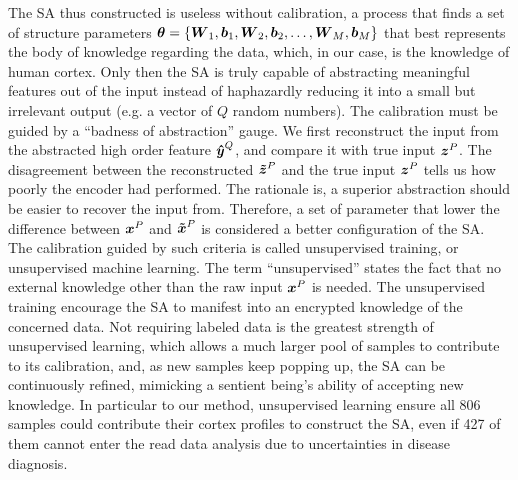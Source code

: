 The SA thus constructed is useless without calibration, a process that finds a set of structure parameters $\boldsymbol{\theta}=\{\boldsymbol{W}_1, \boldsymbol{b}_1, \boldsymbol{W}_2, \boldsymbol{b}_2, \dots, \boldsymbol{W}_M, \boldsymbol{b}_M\}$ that best represents the body of knowledge regarding the data, which, in our case, is the knowledge of human cortex. Only then the SA is truly capable of abstracting meaningful features out of the input instead of haphazardly reducing it into a small but irrelevant output (e.g. a vector of $Q$ random numbers). The calibration must be guided by a ``badness of abstraction'' gauge. We first reconstruct the input from the abstracted high order feature $\boldsymbol{\hat{y}}^Q$, and compare it with true input $\boldsymbol{z}^P$. The disagreement between the reconstructed $\boldsymbol{\tilde{z}}^P$ and the true input $\boldsymbol{z}^P$ tells us how poorly the encoder had performed. The rationale is, a superior abstraction should be easier to recover the input from. Therefore, a set of parameter that lower the difference between $\boldsymbol{x}^P$ and $\boldsymbol{\tilde{x}}^P$ is considered a better configuration of the SA. The calibration guided by such criteria is called unsupervised training, or unsupervised machine learning. The term ``unsupervised'' states the fact that no external knowledge other than the raw input $\boldsymbol{x}^P$ is needed. The unsupervised training encourage the SA to manifest into an encrypted knowledge of the concerned data. Not requiring labeled data is the greatest strength of unsupervised learning, which allows a much larger pool of samples to contribute to its calibration, and, as new samples keep popping up, the SA can be continuously refined, mimicking a sentient being's ability of accepting new knowledge. In particular to our method, unsupervised learning ensure all 806 samples could contribute their cortex profiles to construct the SA, even if 427 of them cannot enter the read data analysis due to uncertainties in disease diagnosis.

